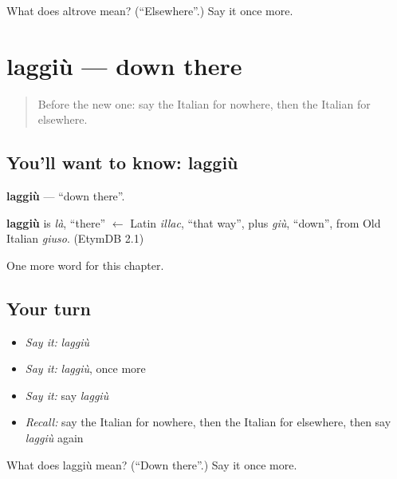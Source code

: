 \begin{tcolorbox}[breakable,colback=teal!4,colframe=teal!35!black,title={Before you move on}]
What does altrove mean? (\textquotedblleft{}Elsewhere\textquotedblright{}.) Say it once more.
\end{tcolorbox}
\section[laggiù]{laggiù — down there}

\label{lesson:IT-C154-laggiu}



\begin{quote}
Before the new one: say the Italian for nowhere, then the Italian for elsewhere.
\end{quote}

\subsection*{You'll want to know: laggiù}
\textbf{laggiù} — \textquotedblleft{}down there\textquotedblright{}.

\begin{cousinweb}
\textbf{laggiù} is \emph{là}, \textquotedblleft{}there\textquotedblright{} $\leftarrow$ Latin \emph{illac}, \textquotedblleft{}that way\textquotedblright{}, plus \emph{giù}, \textquotedblleft{}down\textquotedblright{}, from Old Italian \emph{giuso}. (EtymDB 2.1)
\end{cousinweb}

\begin{grammarlens}[title={What you've built}]
One more word for this chapter.
\end{grammarlens}

\subsection*{Your turn}
\begin{itemize}
\raggedright
  \item \emph{Say it:} \emph{laggiù}
  \item \emph{Say it:} \emph{laggiù}, once more
  \item \emph{Say it:} say \emph{laggiù}
  \item \emph{Recall:} say the Italian for nowhere, then the Italian for elsewhere, then say \emph{laggiù} again
\end{itemize}

\begin{tcolorbox}[breakable,colback=teal!4,colframe=teal!35!black,title={Before you move on}]
What does laggiù mean? (\textquotedblleft{}Down there\textquotedblright{}.) Say it once more.
\end{tcolorbox}
